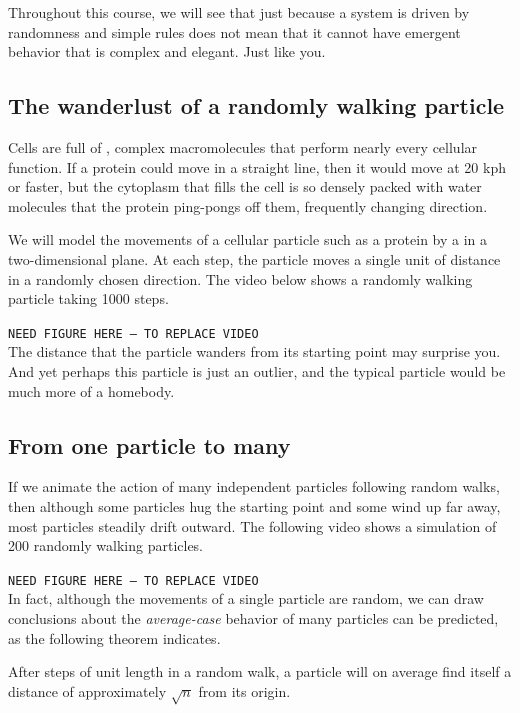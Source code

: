 Throughout this course, we will see that just because a system is driven by randomness and simple rules does not mean that it cannot have emergent behavior that is complex and elegant. Just like you.

\FloatBarrier
{}
\subsection{The wanderlust of a randomly walking particle}

Cells are full of , complex macromolecules that perform nearly every cellular function. If a protein could move in a straight line, then it would move at 20 kph or faster, but the cytoplasm that fills the cell is so densely packed with water molecules that the protein ping-pongs off them, frequently changing direction.

We will model the movements of a cellular particle such as a protein by a  in a two-dimensional plane. At each step, the particle moves a single unit of distance in a randomly chosen direction. The video below shows a randomly walking particle taking 1000 steps.

\texttt{NEED FIGURE HERE -- TO REPLACE VIDEO}\\

The distance that the particle wanders from its starting point may surprise you. And yet perhaps this particle is just an outlier, and the typical particle would be much more of a homebody.

\FloatBarrier
{}
\subsection{From one particle to many}

If we animate the action of many independent particles following random walks, then although some particles hug the starting point and some wind up far away, most particles steadily drift outward. The following video shows a simulation of 200 randomly walking particles.

\texttt{NEED FIGURE HERE -- TO REPLACE VIDEO}\\

In fact, although the movements of a single particle are random, we can draw conclusions about the \textit{average-case} behavior of many particles can be predicted, as the following theorem indicates.

 After  steps of unit length in a random walk, a particle will on average find itself a distance of approximately $\sqrt{n}$ from its origin.\\

